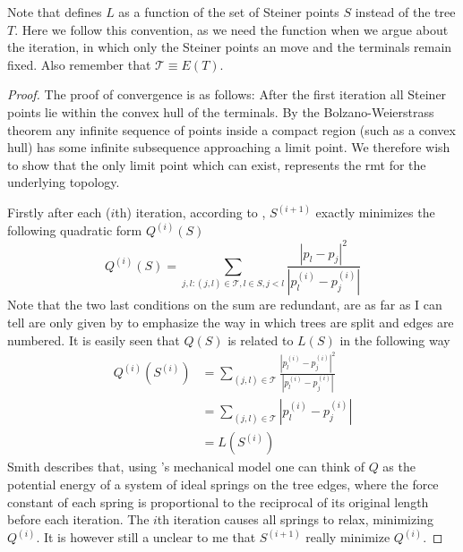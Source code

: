 Note that \textcite{smith1992} defines $L$ as a function of the set of
Steiner points $S$ instead of the tree $T$. Here we follow this
convention, as we need the function when we argue about the iteration, in which
only the Steiner points an move and the terminals remain fixed. Also remember
that $\mathcal{T} \equiv E(T)$.

\begin{proof}
The proof of convergence is as follows: After the first iteration all Steiner
points lie within the convex hull of the terminals. By the Bolzano-Weierstrass
theorem any infinite sequence of points inside a compact region (such as a
convex hull) has some infinite subsequence approaching a limit point. We
therefore wish to show that the only limit point which can exist, represents
the \ac{rmt} for the underlying topology.

Firstly after each ($i$th) iteration, according to \textcite{smith1992},
$S^{(i+1)}$ exactly minimizes the following quadratic form $Q^{(i)}(S)$
%
\begin{equation}
  Q^{(i)}(S) = \sum_{j,l : (j,l) \in \mathcal{T}, l \in S, j < l }
  \frac{|p_l - p_j|^2}{|p^{(i)}_l - p^{(i)}_j|}
\end{equation}
%
Note that the two last conditions on the sum are redundant, are as far as I can
tell are only given by \citeauthor{smith1992} to emphasize the way in which
trees are split and edges are numbered. It is easily seen that $Q(S)$ is related to
$L(S)$ in the following way
%
\begin{align}
  Q^{(i)}(S^{(i)})
  &= \sum_{(j,l) \in \mathcal{T}}
    \frac{|p^{(i)}_l - p^{(i)}_j|^2}{|p^{(i)}_l - p^{(i)}_j|} \\
  &= \sum_{(j,l) \in \mathcal{T}} |p^{(i)}_l - p^{(i)}_j| \\
  &= L(S^{(i)}) \label{eq:24}
\end{align}
%
Smith describes that, using \textcite{gilbert1968}'s mechanical model one can
think of $Q$ as the potential energy of a system of ideal springs on the tree
edges, where the force constant of each spring is proportional to the reciprocal
of its original length before each iteration. The $i$th iteration causes all
springs to relax, minimizing $Q^{(i)}$. It is however still a unclear to me that
$S^{(i+1)}$ really minimize $Q^{(i)}$.



\end{proof}
